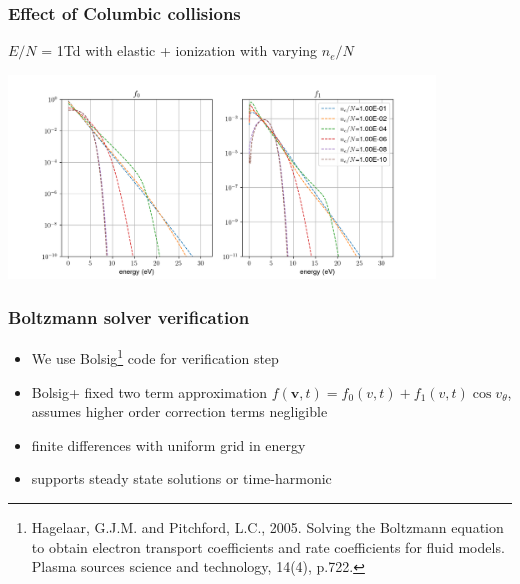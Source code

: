 \documentclass[mathserif, aspectratio=169]{beamer}
\newcommand{\vect}[1]{\boldsymbol{#1}}
\begin{document}
\begin{frame}
	\frametitle{Effect of Columbic collisions}
	$E/N$ = 1Td with elastic + ionization with varying $n_e/N$
	\vspace*{-0.1in}
	\begin{center}
		\includegraphics[width=0.85\textwidth]{1Td_cc.png}
	\end{center}
\end{frame}

\begin{frame}
	\frametitle{Boltzmann solver verification}
	\begin{itemize}
		\item We use Bolsig\footnote[frame]{Hagelaar, G.J.M. and Pitchford, L.C., 2005. Solving the Boltzmann equation to obtain electron transport coefficients and rate coefficients for fluid models. Plasma sources science and technology, 14(4), p.722.} code for verification step 
		\item Bolsig+ fixed two term approximation $f(\vect{v},t) = f_0(v, t) + f_1(v,t)\cos v_\theta$, assumes higher order correction terms negligible
		\item finite differences with uniform grid in energy
		\item supports steady state solutions or time-harmonic 
	\end{itemize}
\end{frame}
\end{document}
